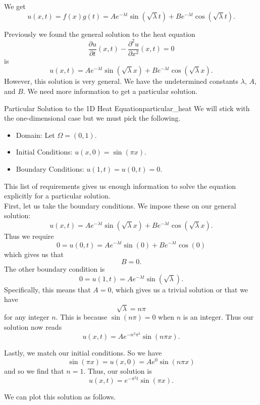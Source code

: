         \begin{answer}
        We get
        \[
        \boxed{u(x,t)=f(x)g(t) = Ae^{-\lambda t}\sin(\sqrt{\lambda}t)+Be^{-\lambda t}\cos(\sqrt{\lambda}t).}
        \]
        \end{answer}
        
        Previously we found the general solution to the heat equation 
        \[
        \frac{\partial u}{\partial t}(x,t) - \frac{\partial^2 u}{\partial x^2} (x,t) = 0
        \]
        is
        \[
        u(x,t)=Ae^{-\lambda t}\sin(\sqrt{\lambda}x)+Be^{-\lambda t}\cos(\sqrt{\lambda}x).
        \]
        However, this solution is very general.  We have the undetermined constants $\lambda$, $A$, and $B$. We need more information to get a particular solution.
        
        \begin{ex}{Particular Solution to the 1D Heat Equation}{particular_heat}
        We will stick with the one-dimensional case but we must pick the following.  
        \begin{itemize}
            \item Domain: Let $\Omega = (0,1)$.
            \item Initial Conditions: $u(x,0)=\sin(\pi x)$.
            \item Boundary Conditions: $u(1,t)=u(0,t)=0$.  
        \end{itemize}
        This list of requirements gives us enough information to solve the equation explicitly for a particular solution.\\
        
        First, let us take the boundary conditions. We impose these on our general solution:
        \[
        u(x,t)=Ae^{-\lambda t}\sin(\sqrt{\lambda}x)+Be^{-\lambda t}\cos(\sqrt{\lambda}x).
        \]
        Thus we require
        \[
        0=u(0,t)=Ae^{-\lambda t}\sin(0)+Be^{-\lambda t}\cos(0)
        \]
        which gives us that
        \[
        B=0.
        \]
        The other boundary condition is
        \[
        0=u(1,t)=Ae^{-\lambda t}\sin(\sqrt{\lambda}).
        \]
        Specifically, this means that $A=0$, which gives us a trivial solution or that we have
        \[
        \sqrt{\lambda}=n\pi
        \]
        for any integer $n$.  This is because $\sin(n\pi)=0$ when $n$ is an integer. Thus our solution now reads
        \[
        u(x,t)=Ae^{-n^2\pi^2}\sin(n\pi x).
        \]
        
        Lastly, we match our initial conditions.  So we have
        \[
        \sin(\pi x)=u(x,0)=A e^0 \sin(n\pi x)
        \]
        and so we find that $n=1$.  Thus, our solution is
        \[
        \boxed{u(x,t)=e^{-\pi^2 t} \sin(\pi x).}
        \] 
        
        We can plot this solution as follows.
        \begin{figure}[H]
        	\centering
        	\def\svgwidth{0.75\columnwidth}
        	
        \end{figure}
        \end{ex}
        
